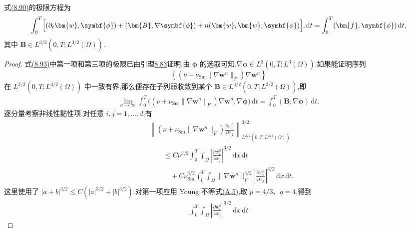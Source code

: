\begin{lemma}[极限方程]
\label{lem:smagorinsky-limiting-equation}
式\hyperref[eq:smagorinsky-galerkin-integrated-test]{(8.90)}的极限方程为
\begin{equation}\label{eq:smagorinsky-limiting-equation}
 \int_0^T\Bigl[
      (\partial_t\bm{w},\symbf{\phi})
      +(\bm{B},\nabla\symbf{\phi})
      +n(\bm{w},\bm{w},\symbf{\phi})
      \Bigr],\mathrm{d}t
 =\int_0^T(\bm{f},\symbf{\phi})\,\mathrm{d}t,
\end{equation}
其中 $\bm{B}\in L^{3/2}(0,T;L^{3/2}(\Omega))$.
\begin{proof}
式\hyperref[eq:smagorinsky-limiting-equation]{(8.93)}中第一项和第三项的极限已由引理\hyperref[lem:smagorinsky-convection-convergence]{8.83}证明.由 $\symbf{\phi}$ 的选取可知,$\nabla\symbf{\phi}\in L^3(0,T;L^3(\Omega))$.如果能证明序列
\[
 \left\{(\nu+\nu_{\mathrm{Sm}}\|\nabla\bm{w}^n\|_F)
                \nabla\bm{w}^n\right\}
\]
在 $L^{3/2}(0,T;L^{3/2}(\Omega))$ 中一致有界,那么便存在子列弱收敛到某个
$\bm{B}\in L^{3/2}(0,T;L^{3/2}(\Omega))$,即
\[
\begin{aligned}
 \lim_{n\to\infty}\int_0^T
   \bigl((\nu+\nu_{\mathrm{Sm}}\|\nabla\bm{w}^n\|_F)
           \nabla\bm{w}^n,\nabla\symbf{\phi}\bigr)\,\mathrm{d}t
 =\int_0^T(\bm{B},\nabla\symbf{\phi})\,\mathrm{d}t.
\end{aligned}
\]
逐分量考察非线性黏性项.对任意 $i,j=1,\ldots,d$,有
\begin{equation}\label{eq:smagorinsky-viscous-component-bound}
\begin{aligned}
 &\left\|
    (\nu+\nu_{\mathrm{Sm}}\|\nabla\bm{w}^n\|_F)
    \frac{\partial w_i^n}{\partial x_j}
   \right\|_{L^{3/2}(0,T;L^{3/2}(\Omega))}^{3/2}\\
 &\qquad\le C\nu^{3/2}\int_0^T\int_\Omega
          \left|\frac{\partial w_i^n}{\partial x_j}\right|^{3/2}
                              \,\mathrm{d}x\,\mathrm{d}t\\
 &\qquad\quad+C\nu_{\mathrm{Sm}}^{3/2}\int_0^T\int_\Omega
      \|\nabla\bm{w}^n\|_F^{3/2}
          \left|\frac{\partial w_i^n}{\partial x_j}\right|^{3/2}
                              \,\mathrm{d}x\,\mathrm{d}t.
\end{aligned}
\end{equation}
这里使用了 $|a+b|^{3/2}\le C(|a|^{3/2}+|b|^{3/2})$.对第一项应用 Young 不等式\hyperref[eq:appendix-a-5]{(A.5)},取 $p=4/3$、$q=4$,得到
\[
\begin{aligned}
 \int_0^T\int_\Omega
   \left|\frac{\partial w_i^n}{\partial x_j}\right|^{3/2}
                       \,\mathrm{d}x\,\mathrm{d}t

\end{aligned}\]
\end{proof}
\end{lemma}
